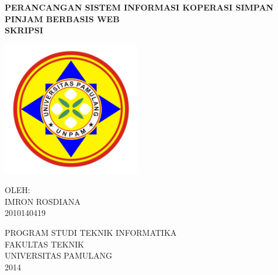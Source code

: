\begin{titlepage}
\begin{center}
	\onehalfspacing
	\large \bfseries PERANCANGAN SISTEM INFORMASI KOPERASI SIMPAN PINJAM BERBASIS WEB \\
	\vspace{1cm}
	 \large SKRIPSI \\
	
	\vspace{2cm}
	
	\includegraphics[width=6cm]{images/logo-unpam.png}
	
	\vspace{1cm}
	\large OLEH: \\
	IMRON ROSDIANA \\
	2010140419
	
	\vspace{3cm}
	
	\normalsize PROGRAM STUDI TEKNIK INFORMATIKA \\
	\large FAKULTAS TEKNIK \\
	UNIVERSITAS PAMULANG \\
	2014
	

	
\end{center}

\end{titlepage}

\newpage